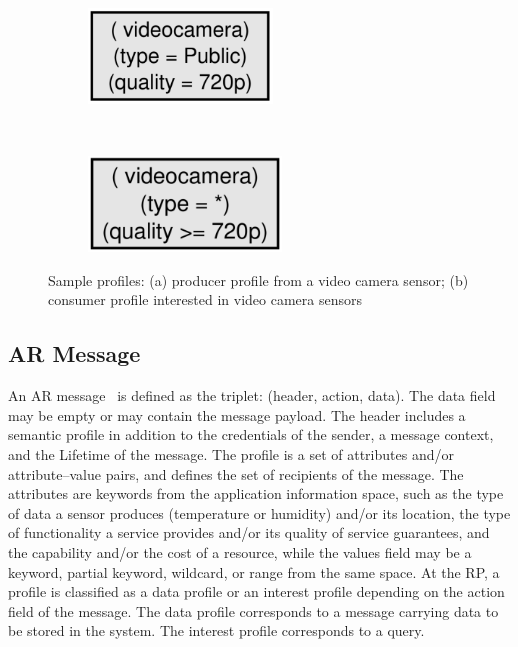 \begin{figure}
    \centering
    \begin{subfigure}[t]{0.5\textwidth}
        \centering
        \includegraphics[height=1in]{Figures/data_profile.pdf}
        \caption{}
        \label{fig:data_profile}
    \end{subfigure}%
    ~ 
    \begin{subfigure}[t]{0.5\textwidth}
        \centering
        \includegraphics[height=1in]{Figures/interest_profile.pdf}
        \caption{}
        \label{fig:interest_profile}
    \end{subfigure}
    \caption{Sample profiles: (a) producer profile from a video camera sensor; (b) consumer profile interested in video camera sensors}\label{fig:samples_profiles}
\end{figure}



\subsection{AR Message}
An AR message~\cite{meteor2008} is defined as the triplet: (header, action, data). The data field may be empty or may contain the message payload. The header includes a semantic profile in addition to the credentials of the sender, a message context, and the Lifetime of the message. The profile is a set of attributes and/or attribute–value pairs, and defines the set of recipients of the message. The attributes are keywords from the application information space, such as the type of data a sensor produces (temperature or humidity) and/or its location, the type of functionality a service provides and/or its quality of service guarantees, and the capability and/or the cost of a resource, while the values field may be a keyword, partial keyword, wildcard, or range from the same space. At the RP, a profile is classified as a data profile or an interest profile depending on the action field of the message. The data profile corresponds to a message carrying data to be stored in the system. The interest profile corresponds to a query.

